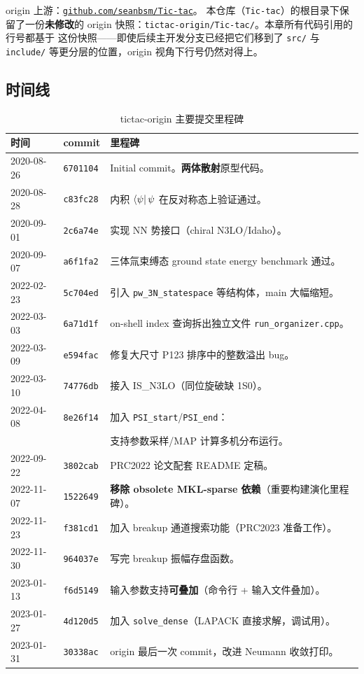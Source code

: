origin 上游：\href{https://github.com/seanbsm/Tic-tac}{\texttt{github.com/seanbsm/Tic-tac}}。
本仓库（\texttt{Tic-tac}）的根目录下保留了一份\textbf{未修改}的 origin
快照：\texttt{tictac-origin/Tic-tac/}。本章所有代码引用的行号都基于
这份快照——即使后续主开发分支已经把它们移到了 \texttt{src/} 与
\texttt{include/} 等更分层的位置，origin 视角下行号仍然对得上。

\subsection{时间线}

\begin{table}[ht]
\centering
\caption{tictac-origin 主要提交里程碑}
\label{tab:ch18-timeline}
\small
\begin{tabular}{p{2.0cm}p{1.6cm}p{9cm}}
\toprule
\textbf{时间} & \textbf{commit} & \textbf{里程碑} \\
\midrule
2020-08-26 & \texttt{6701104} & Initial commit。\textbf{两体散射}原型代码。\\
2020-08-28 & \texttt{c83fc28} & 内积 $\bra{\psi}{\psi}$ 在反对称态上验证通过。\\
2020-09-01 & \texttt{2c6a74e} & 实现 NN 势接口（chiral N3LO/Idaho）。\\
2020-09-07 & \texttt{a6f1fa2} & 三体氚束缚态 ground state energy benchmark 通过。\\
2022-02-23 & \texttt{5c704ed} & 引入 \texttt{pw\_3N\_statespace} 等结构体，main 大幅缩短。\\
2022-03-03 & \texttt{6a71d1f} & on-shell index 查询拆出独立文件 \texttt{run\_organizer.cpp}。\\
2022-03-09 & \texttt{e594fac} & 修复大尺寸 P123 排序中的整数溢出 bug。\\
2022-03-10 & \texttt{74776db} & 接入 IS\_N3LO（同位旋破缺 1S0）。\\
2022-04-08 & \texttt{8e26f14} & 加入 \texttt{PSI\_start}/\texttt{PSI\_end}：\\
                                & & 支持参数采样/MAP 计算多机分布运行。\\
2022-09-22 & \texttt{3802cab} & PRC2022 论文配套 README 定稿。\\
2022-11-07 & \texttt{1522649} & \textbf{移除 obsolete MKL-sparse 依赖}（重要构建演化里程碑）。\\
2022-11-23 & \texttt{f381cd1} & 加入 breakup 通道搜索功能（PRC2023 准备工作）。\\
2022-11-30 & \texttt{964037e} & 写完 breakup 振幅存盘函数。\\
2023-01-13 & \texttt{f6d5149} & 输入参数支持\textbf{可叠加}（命令行 + 输入文件叠加）。\\
2023-01-27 & \texttt{4d120d5} & 加入 \texttt{solve\_dense}（LAPACK 直接求解，调试用）。\\
2023-01-31 & \texttt{30338ac} & origin 最后一次 commit，改进 Neumann 收敛打印。\\
\bottomrule
\end{tabular}
\end{table}

